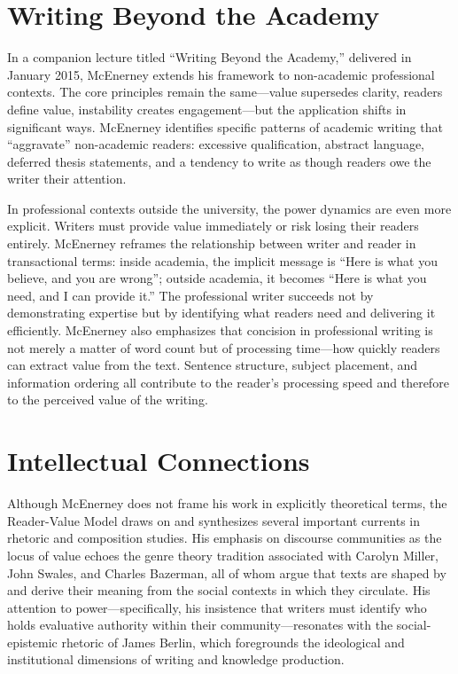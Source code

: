 \documentclass[12pt]{article}
\begin{document}
\section*{Writing Beyond the Academy}

In a companion lecture titled ``Writing Beyond the Academy,'' delivered in January 2015, McEnerney extends his framework to non-academic professional contexts. The core principles remain the same---value supersedes clarity, readers define value, instability creates engagement---but the application shifts in significant ways. McEnerney identifies specific patterns of academic writing that ``aggravate'' non-academic readers: excessive qualification, abstract language, deferred thesis statements, and a tendency to write as though readers owe the writer their attention.

In professional contexts outside the university, the power dynamics are even more explicit. Writers must provide value immediately or risk losing their readers entirely. McEnerney reframes the relationship between writer and reader in transactional terms: inside academia, the implicit message is ``Here is what you believe, and you are wrong''; outside academia, it becomes ``Here is what you need, and I can provide it.'' The professional writer succeeds not by demonstrating expertise but by identifying what readers need and delivering it efficiently. McEnerney also emphasizes that concision in professional writing is not merely a matter of word count but of processing time---how quickly readers can extract value from the text. Sentence structure, subject placement, and information ordering all contribute to the reader's processing speed and therefore to the perceived value of the writing.

\section*{Intellectual Connections}

Although McEnerney does not frame his work in explicitly theoretical terms, the Reader-Value Model draws on and synthesizes several important currents in rhetoric and composition studies. His emphasis on discourse communities as the locus of value echoes the genre theory tradition associated with Carolyn Miller, John Swales, and Charles Bazerman, all of whom argue that texts are shaped by and derive their meaning from the social contexts in which they circulate. His attention to power---specifically, his insistence that writers must identify who holds evaluative authority within their community---resonates with the social-epistemic rhetoric of James Berlin, which foregrounds the ideological and institutional dimensions of writing and knowledge production.
\end{document}
